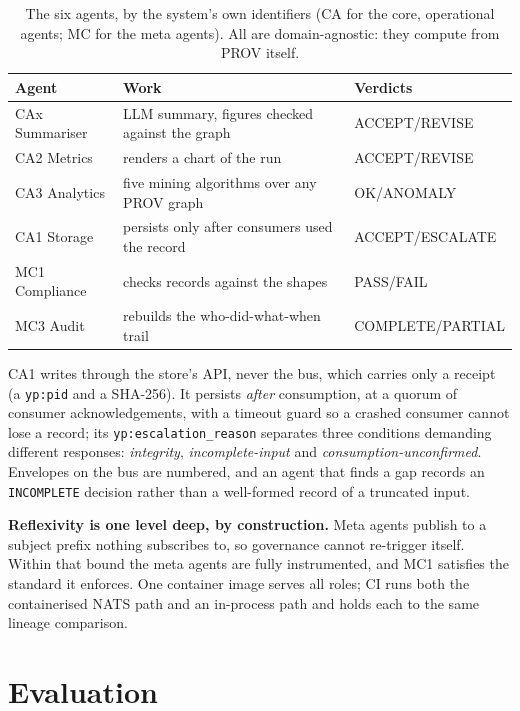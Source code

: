 \documentclass[conference]{IEEEtran}
\begin{document}
\begin{table}[t]
\centering\footnotesize
\caption{The six agents, by the system's own identifiers (CA for the core, operational agents; MC for the meta agents). All are domain-agnostic: they compute from PROV itself.}\label{tab:2}
\begin{tabularx}{\columnwidth}{lLl}
\toprule
Agent & Work & Verdicts \\
\midrule
CAx Summariser & LLM summary, figures checked against the graph & ACCEPT/REVISE \\
CA2 Metrics & renders a chart of the run & ACCEPT/REVISE \\
CA3 Analytics & five mining algorithms over any PROV graph & OK/ANOMALY \\
CA1 Storage & persists only after consumers used the record & ACCEPT/ESCALATE \\
MC1 Compliance & checks records against the shapes & PASS/FAIL \\
MC3 Audit & rebuilds the who-did-what-when trail & COMPLETE/PARTIAL \\
\bottomrule
\end{tabularx}
\end{table}

\noindent CA1 writes through the store's API, never the bus, which carries only a receipt (a \texttt{yp:\allowbreak{}pid} and a SHA-256). It persists \emph{after} consumption, at a quorum of consumer acknowledgements, with a timeout guard so a crashed consumer cannot lose a record; its \texttt{yp:\allowbreak{}escalation\_\allowbreak{}reason} separates three conditions demanding different responses: \emph{integrity}, \emph{incomplete-input} and \emph{consumption-unconfirmed}. Envelopes on the bus are numbered, and an agent that finds a gap records an \texttt{INCOMPLETE} decision rather than a well-formed record of a truncated input.

\noindent \textbf{Reflexivity is one level deep, by construction.} Meta agents publish to a subject prefix nothing subscribes to, so governance cannot re-trigger itself. Within that bound the meta agents are fully instrumented, and MC1 satisfies the standard it enforces. One container image serves all roles; CI runs both the containerised NATS path and an in-process path and holds each to the same lineage comparison.

\section{Evaluation}\label{sec:5}
\end{document}
